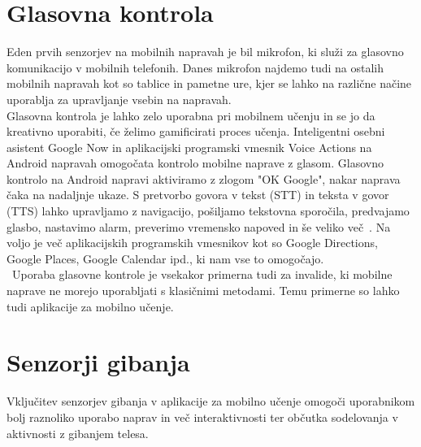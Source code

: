 \documentclass[a4paper, 12pt]{book}
\begin{document}
\section{Glasovna kontrola}
Eden prvih senzorjev na mobilnih napravah je bil mikrofon, ki služi za glasovno komunikacijo v mobilnih telefonih. Danes mikrofon najdemo tudi na ostalih mobilnih napravah kot so tablice in pametne ure, kjer se lahko na različne načine uporablja za upravljanje vsebin na napravah.\\Glasovna kontrola je lahko zelo uporabna pri mobilnem učenju in se jo da kreativno uporabiti, če želimo gamificirati proces učenja. Inteligentni osebni asistent Google Now in aplikacijski programski vmesnik Voice Actions na Android napravah omogočata kontrolo mobilne naprave z glasom. Glasovno kontrolo na Android napravi aktiviramo z zlogom "OK Google", nakar naprava čaka na nadaljnje ukaze. S pretvorbo govora v tekst (STT) in teksta v govor (TTS) lahko upravljamo z navigacijo, pošiljamo tekstovna sporočila, predvajamo glasbo, nastavimo alarm, preverimo vremensko napoved in še veliko več~\cite{now}. Na voljo je več aplikacijskih programskih vmesnikov kot so Google Directions, Google Places, Google Calendar ipd., ki nam vse to omogočajo.\\\ Uporaba glasovne kontrole je vsekakor primerna tudi za invalide, ki mobilne naprave ne morejo uporabljati s klasičnimi metodami. Temu primerne so lahko tudi aplikacije za mobilno učenje.

\section{Senzorji gibanja}
Vključitev senzorjev gibanja v aplikacije za mobilno učenje omogoči uporabnikom bolj raznoliko uporabo naprav in več interaktivnosti ter občutka sodelovanja v aktivnosti z gibanjem telesa.
\end{document}

